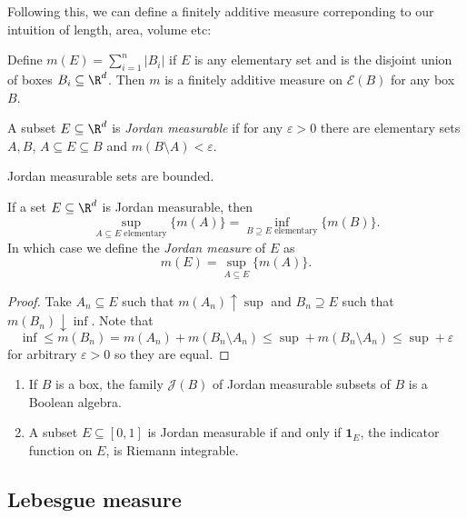 \documentclass[a4paper]{article}
\begin{document}
Following this, we can define a finitely additive measure correponding to our intuition of length, area, volume etc:

\begin{proposition}
  Define \(m(E) = \sum_{i = 1}^n |B_i|\) if \(E\) is any elementary set and is the disjoint union of boxes \(B_i \subseteq \R^d\). Then \(m\) is a finitely additive measure on \(\mathcal E(B)\) for any box \(B\).
\end{proposition}

\begin{definition}
  A subset \(E \subseteq \R^d\) is \emph{Jordan measurable} if for any \(\varepsilon > 0\) there are elementary sets \(A, B\), \(A \subseteq E \subseteq B\) and \(m(B \setminus A) < \varepsilon\).
\end{definition}

\begin{remark}
  Jordan measurable sets are bounded.
\end{remark}

\begin{proposition}
  If a set \(E \subseteq \R^d\) is Jordan measurable, then
  \[
    \sup_{A \subseteq E \text{ elementary}} \{m(A)\} = \inf_{B \supseteq E \text{ elementary}} \{m(B)\}.
  \]
  In which case we define the \emph{Jordan measure} of \(E\) as
  \[
    m(E) = \sup_{A \subseteq E} \{m(A)\}.
  \]
\end{proposition}

\begin{proof}
  Take \(A_n \subseteq E\) such that \(m(A_n) \uparrow \sup\) and \(B_n \supseteq E\) such that \(m(B_n) \downarrow \inf\). Note that
  \[
    \inf \leq m(B_n) = m(A_n) + m(B_n \setminus A_n) \leq \sup + m(B_n \setminus A_n) \leq \sup + \varepsilon
  \]
  for arbitrary \(\varepsilon > 0\) so they are equal.
\end{proof}

\begin{ex}\leavevmode
  \begin{enumerate}
  \item If \(B\) is a box, the family \(\mathcal J(B)\) of Jordan measurable subsets of \(B\) is a Boolean algebra.
  \item A subset \(E \subseteq [0, 1]\) is Jordan measurable if and only if \(\mathbf 1_E\), the indicator function on \(E\), is Riemann integrable.
  \end{enumerate}
\end{ex}

\subsection{Lebesgue measure}
\end{document}
